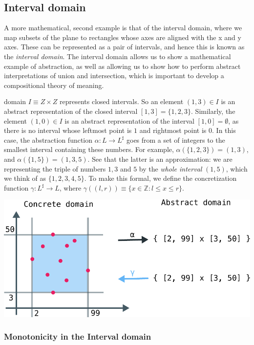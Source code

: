\documentclass[11pt]{book}
\begin{document}
\subsection{Interval domain}

A more mathematical, second example is that of the interval domain, where we map
subsets of the plane to rectangles whose axes are aligned with the x and y axes.
These can be represented as a pair of intervals, and hence this is known as the
\emph{interval domain}. The interval domain allows us to show a mathematical example
of abstraction, as well as allowing us to show how to perform abstract interpretations
of union and intersection, which is important to develop a compositional theory of meaning.

domain $I \equiv Z \times Z$ represents closed intervals. So an element $(1, 3)
\in I$ is an abstract representation of the closed interval $[1, 3] = \{ 1, 2,
3 \}$.  Similarly, the element $(1, 0) \in I$ is an abstract representation of
the interval $[1, 0] = \emptyset$, as there is no interval whose leftmost point
is $1$ and rightmost point is $0$.  In this case, the abstraction function
$\alpha: L \rightarrow L^\sharp$ goes from a set of integers to the smallest
interval containing these numbers. For example, $\alpha(\{1, 2, 3\}) = (1, 3)$,
and $\alpha(\{1, 5\}) = (1, 3, 5)$.  See that the latter is an approximation:
we are representing the triple of numbers $1, 3$ and $5$ by the \emph{whole
interval} $(1, 5)$, which we think of as $\{1, 2, 3, 4, 5\}$. To make this
formal, we define the concretization function $\gamma: L^\sharp \rightarrow L$,
where $\gamma((l, r)) \equiv \{ x \in \mathbb Z : l \leq x \leq r \}$.

\includegraphics[width=\textwidth]{./alpha-gamma-intervals.pdf}



\subsubsection{Monotonicity in the Interval domain}
\end{document}
